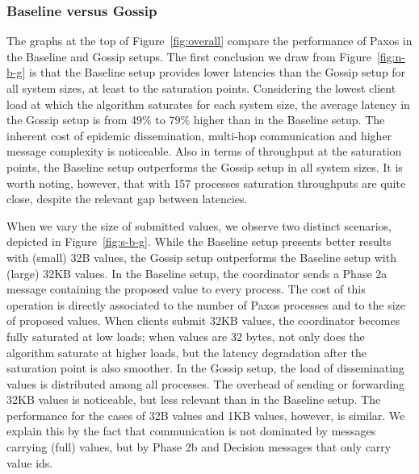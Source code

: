 \subsubsection{Baseline versus Gossip}
\label{sec:basevsgossip}

The graphs at the top of Figure~\ref{fig:overall} compare the performance of
Paxos in the Baseline and Gossip setups.
The first conclusion we draw from Figure~\ref{fig:n-b-g} is that the
Baseline setup provides lower latencies than the Gossip setup for all system
sizes, at least to the saturation points.
Considering the lowest client load at which the algorithm saturates for each
system size, the average latency in the Gossip setup is from 49\% to 79\% higher
than in the Baseline setup.
%
The inherent cost of epidemic dissemination, multi-hop communication and higher
message complexity is noticeable.
%
Also in terms of throughput at the saturation points, the Baseline setup
outperforms the Gossip setup in all system sizes.
It is worth noting, however, that with 157 processes saturation throughputs are
quite close, despite the relevant gap between latencies.

When we vary the size of submitted values, we observe two distinct scenarios,
depicted in Figure~\ref{fig:s-b-g}.
While the Baseline setup presents better results with (small) 32B values, the
Gossip setup outperforms the Baseline setup with (large) 32KB values.
%
In the Baseline setup, the coordinator sends a Phase 2a message containing the
proposed value to every process.
The cost of this operation is directly associated to the number of
Paxos processes and to the size of proposed values.
%
When clients submit 32KB values, the coordinator becomes fully saturated at
low loads; when values are 32 bytes, not only does the algorithm saturate at
higher loads, but the latency degradation after the saturation point is also
smoother.
%
In the Gossip setup, the load of disseminating values is distributed among all
processes.
The overhead of sending or forwarding 32KB values is noticeable, but less relevant than in the Baseline setup.
%
The performance for the cases of 32B values and 1KB values, however, is similar.
We explain this by the fact that communication is not dominated by messages carrying
(full) values, but by Phase 2b and Decision messages that only carry value ids.

